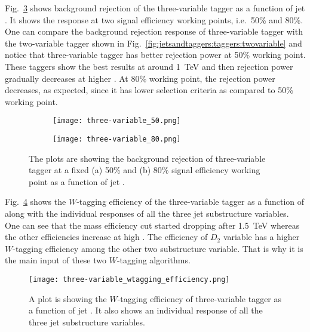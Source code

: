 Fig.\ \ref{fig:jetsandtaggers:taggers:threevariable} shows background rejection of the three-variable tagger as a function of jet \pt. It shows the response at two signal efficiency working points, i.e.\ 50\% and 80\%. One can compare the background rejection response of three-variable tagger with the two-variable tagger shown in Fig.\ \ref{fig:jetsandtaggers:taggers:twovariable} and notice that three-variable tagger has better rejection power at 50\% working point. These taggers show the best results at around \SI{1}{\tera\electronvolt} and then rejection power gradually decreases at higher \pt. At 80\% working point, the rejection power decreases, as expected, since it has lower selection criteria as compared to 50\% working point.

\begin{figure}[hbt!]
	\centering
	\begin{subfigure}{.45\textwidth}
		\centering
		\texttt{[image: three-variable\_50.png]}
		\caption{}
		\label{fig:jetsandtaggers:taggers:threevariable:50}
	\end{subfigure}\hspace{0.3cm}
	\begin{subfigure}{.45\textwidth}
		\centering
		\texttt{[image: three-variable\_80.png]}
		\caption{}
		\label{fig:jetsandtaggers:taggers:threevariable:80}
	\end{subfigure}
	\caption{The plots are showing the background rejection of three-variable tagger at a fixed (a) 50\% and (b) 80\% signal efficiency working point as a function of jet \pt.~\cite{wtagger}}
	\label{fig:jetsandtaggers:taggers:threevariable}
\end{figure}

Fig.\ \ref{fig:jetsandtaggers:taggers:threevariable:signal} shows the $W$-tagging efficiency of the three-variable tagger as a function of \pt along with the individual responses of all the three jet substructure variables. One can see that the mass efficiency cut started dropping after \SI{1.5}{\tera\electronvolt} whereas the other efficiencies increase at high \pt. The efficiency of $D_{2}$ variable has a higher $W$-tagging efficiency among the other two substructure variable. That is why it is the main input of these two $W$-tagging algorithms. 

\begin{figure}[hbt!]
	\centering
	\texttt{[image: three-variable\_wtagging\_efficiency.png]}
	\caption{A plot is showing the $W$-tagging efficiency of three-variable tagger as a function of jet \pt. It also shows an individual response of all the three jet substructure variables.~\cite{wtagger}}
	\label{fig:jetsandtaggers:taggers:threevariable:signal}
\end{figure}



